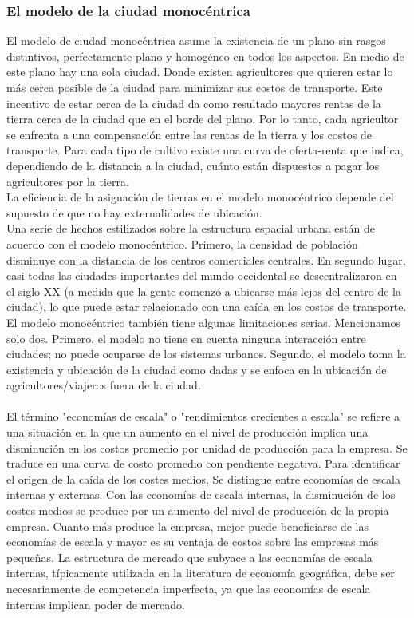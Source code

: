 \subsubsection{El modelo de la ciudad monocéntrica}
El modelo de ciudad monocéntrica asume la existencia de un plano sin rasgos distintivos, perfectamente plano y homogéneo en todos los aspectos. En medio de este plano hay una sola ciudad. Donde existen  agricultores que quieren estar lo más cerca posible de la ciudad para minimizar sus costos de transporte. Este incentivo de estar cerca de la ciudad da como resultado mayores rentas de la tierra cerca de la ciudad que en el borde del plano. Por lo tanto, cada agricultor se enfrenta a una compensación entre las rentas de la tierra y los costos de transporte. Para cada tipo de cultivo existe una curva de oferta-renta que indica, dependiendo de la distancia a la ciudad, cuánto están dispuestos a pagar los agricultores por la tierra.\\
La eficiencia de la asignación de tierras en el modelo monocéntrico depende del supuesto de que no hay externalidades de ubicación.\\
Una serie de hechos estilizados sobre la estructura espacial urbana están de acuerdo con el modelo monocéntrico. Primero, la densidad de población disminuye con la distancia de los centros comerciales centrales. En segundo lugar, casi todas las ciudades importantes del mundo occidental se descentralizaron en el siglo XX (a medida que la gente comenzó a ubicarse más lejos del centro de la ciudad), lo que puede estar relacionado con una caída en los costos de transporte. El modelo monocéntrico también tiene algunas limitaciones serias. Mencionamos solo dos. Primero, el modelo no tiene en cuenta ninguna interacción entre ciudades; no puede ocuparse de los sistemas urbanos. Segundo, el modelo toma la existencia y ubicación de la ciudad como dadas y se enfoca en la ubicación de agricultores/viajeros fuera de la ciudad. \\\\
El término "economías de escala" o "rendimientos crecientes a escala" se refiere a una situación en la que un aumento en el nivel de producción implica una disminución en los costos promedio por unidad de producción para la empresa. Se traduce en una curva de costo promedio con pendiente negativa. Para identificar el origen de la caída de los costes medios, Se distingue entre economías de escala internas y externas. Con las economías de escala internas, la disminución de los costes medios se produce por un aumento del nivel de producción de la propia empresa. Cuanto más produce la empresa, mejor puede beneficiarse de las economías de escala y mayor es su ventaja de costos sobre las empresas más pequeñas. La estructura de mercado que subyace a las economías de escala internas, típicamente utilizada en la literatura de economía geográfica, debe ser necesariamente de competencia imperfecta, ya que las economías de escala internas implican poder de mercado.\\
